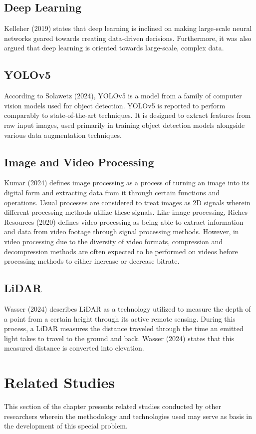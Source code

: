 \documentclass{report} %
\begin{document}
	\subsection{Deep Learning}
	Kelleher (2019) states that deep learning is inclined on making large-scale neural networks geared towards creating data-driven decisions. Furthermore, it was also argued that deep learning is oriented towards large-scale, complex data.
	
	\subsection{YOLOv5}
	According to Solawetz (2024), YOLOv5 is a model from a family of computer vision models used for object detection. YOLOv5 is reported to perform comparably to state-of-the-art techniques. It is designed to extract features from raw input images, used primarily in training object detection models alongside various data augmentation techniques.
	
	\subsection{Image and Video Processing}
	Kumar (2024) defines image processing as a process of turning an image into its digital form and extracting data from it through certain functions and operations. Usual processes are considered to treat images as 2D signals wherein different processing methods utilize these signals.
	Like image processing, Riches Resources (2020) defines video processing as being able to extract information and data from video footage through signal processing methods. However, in video processing due to the diversity of video formats, compression and decompression methods are often expected to be performed on videos before processing methods to either increase or decrease bitrate.
	
	\subsection{LiDAR}
	Wasser (2024) describes LiDAR as a technology utilized to measure the depth of a point from a certain height through its active remote sensing. During this process, a LiDAR measures the distance traveled through the time an emitted light takes to travel to the ground and back. Wasser (2024) states that this measured distance is converted into elevation.
	
	
	\section{Related Studies}
	This section of the chapter presents related studies conducted by other researchers wherein the methodology and technologies used may serve as basis in the development of this special problem.
	
\end{document}
